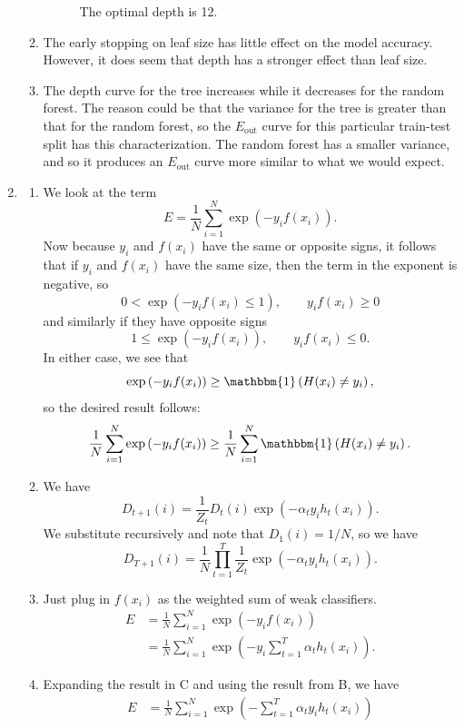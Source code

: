 \documentclass[12pt]{article}
\newcommand{\Eout}{E_{\text{out}}}
\begin{document}
\begin{enumerate}[leftmargin=*]
\begin{enumerate}[label=\Alph*.]
\begin{figure}[h!]
\caption{The optimal depth is 12.} \label{depthrf}
\end{figure}
\item The early stopping on leaf size has little effect on the model accuracy. However, it does seem that depth has a stronger effect than leaf size.
\item The depth curve for the tree increases while it decreases for the random forest. The reason could be that the variance for the tree is greater than that for the random forest, so the $\Eout$ curve for this particular train-test split has this characterization. The random forest has a smaller variance, and so it produces an $\Eout$ curve more similar to what we would expect.
\end{enumerate}
\item
\begin{enumerate}[label=\Alph*.]
\item We look at the term
\[ E = \frac{1}{N} \sum_{i = 1}^N \exp \left(-y_i f(x_i) \right). \]
Now because $y_i$ and $f(x_i)$ have the same or opposite signs, it follows that if $y_i$ and $f(x_i)$ have the same size, then the term in the exponent is negative, so
\[ 0 < \exp \left( - y_i f(x_i) \leq 1 \right), \qquad y_i f(x_i) \geq 0 \]
and similarly if they have opposite signs
\[ 1 \leq \exp \left(- y_i f(x_i) \right), \qquad y_i f(x_i) \leq 0. \]
In either case, we see that
\[ \exp \left( -y_i f(x_i) \right) \geq \mathbbm{1} \left( H(x_i) \neq y_i \right), \]
so the desired result follows:
\[ \frac{1}{N} \sum_{i = 1}^N \exp \left( - y_i f(x_i) \right) \geq \frac{1}{N} \sum_{i = 1}^N \mathbbm{1} \left(H(x_i) \neq y_i \right). \]
\item We have
\[ D_{t + 1}(i) = \frac{1}{Z_t} D_t(i) \exp \left( -\alpha_t y_i h_t(x_i) \right). \]
We substitute recursively and note that $D_1(i) = 1 / N$, so we have
\[ D_{T + 1}(i) = \frac{1}{N} \prod_{t = 1}^T \frac{1}{Z_t} \exp \left( - \alpha_t y_i h_t(x_i) \right). \]
\item Just plug in $f(x_i)$ as the weighted sum of weak classifiers.
\begin{align*}
E &= \frac{1}{N} \sum_{i = 1}^N \exp \left(- y_i f(x_i) \right) \\
&= \frac{1}{N} \sum_{i = 1}^N \exp \left(- y_i \sum_{t = 1}^T \alpha_t h_t(x_i) \right).
\end{align*}
\item Expanding the result in C and using the result from B, we have
\begin{align*}
E &= \frac{1}{N} \sum_{i = 1}^N \exp \left( - \sum_{t = 1}^T \alpha_t y_i h_t(x_i) \right) \\

\end{align*}
\end{enumerate}
\end{enumerate}
\end{document}
